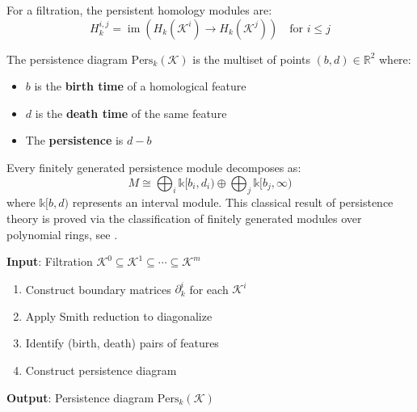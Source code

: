 \begin{definition}\label{def:modulos_homologia_persistente}
For a filtration, the persistent homology modules are:
\begin{equation}
    H_k^{i,j} = \operatorname{im}(H_k(\mathcal{K}^i) \to H_k(\mathcal{K}^j)) \quad \text{for } i \leq j
\end{equation}
\end{definition}

\begin{definition}\label{def:diagrama_persistencia}
The persistence diagram $\text{Pers}_k(\mathcal{K})$ is the multiset of points $(b,d) \in \mathbb{R}^2$ where:
\begin{itemize}
    \item $b$ is the \textbf{birth time} of a homological feature
    \item $d$ is the \textbf{death time} of the same feature
    \item The \textbf{persistence} is $d - b$
\end{itemize}
\end{definition}

\begin{theorem}\label{thm:descomposicion_modulos}
Every finitely generated persistence module decomposes as:
\begin{equation}
    M \cong \bigoplus_i \mathbb{k}[b_i, d_i) \oplus \bigoplus_j \mathbb{k}[b_j, \infty)
\end{equation}
where $\mathbb{k}[b,d)$ represents an interval module. This classical result of persistence theory is proved via the classification of finitely generated modules over polynomial rings, see \citep{Hatcher2002}.
\end{theorem}

\begin{algorithm}[H]
\caption{Persistent Homology Algorithm}\label{alg:homologia_persistente}
\textbf{Input}: Filtration $\mathcal{K}^0 \subseteq \mathcal{K}^1 \subseteq \cdots \subseteq \mathcal{K}^m$
\begin{enumerate}
    \item Construct boundary matrices $\partial_k^i$ for each $\mathcal{K}^i$
    \item Apply Smith reduction to diagonalize
    \item Identify (birth, death) pairs of features
    \item Construct persistence diagram
\end{enumerate}
\textbf{Output}: Persistence diagram $\text{Pers}_k(\mathcal{K})$
\end{algorithm}

